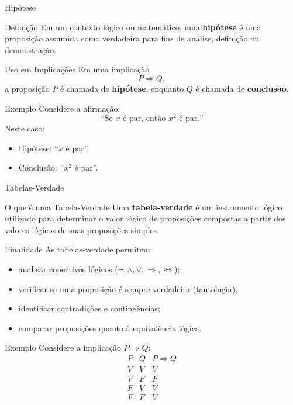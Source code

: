 \documentclass[9pt]{beamer}
\begin{document}
\begin{frame}{Hipótese}

\begin{block}{Definição}
Em um contexto lógico ou matemático, uma \textbf{hipótese} é uma proposição
assumida como verdadeira para fins de análise, definição ou demonstração.
\end{block}

\begin{block}{Uso em Implicações}
Em uma implicação
\[
P \Rightarrow Q,
\]
a proposição $P$ é chamada de \textbf{hipótese},
enquanto $Q$ é chamada de \textbf{conclusão}.
\end{block}

\begin{block}{Exemplo}
Considere a afirmação:
\[
\text{``Se $x$ é par, então $x^2$ é par.''}
\]
Neste caso:
\begin{itemize}
    \item Hipótese: ``$x$ é par''.
    \item Conclusão: ``$x^2$ é par''.
\end{itemize}
\end{block}

\end{frame}
\begin{frame}{Tabelas-Verdade}

\begin{block}{O que é uma Tabela-Verdade}
Uma \textbf{tabela-verdade} é um instrumento lógico utilizado para determinar
o valor lógico de proposições compostas a partir dos valores lógicos
de suas proposições simples.
\end{block}

\begin{block}{Finalidade}
As tabelas-verdade permitem:
\begin{itemize}
    \item analisar conectivos lógicos (\(\neg, \land, \lor, \Rightarrow, \Leftrightarrow\));
    \item verificar se uma proposição é sempre verdadeira (tautologia);
    \item identificar contradições e contingências;
    \item comparar proposições quanto à equivalência lógica.
\end{itemize}
\end{block}

\begin{block}{Exemplo}
Considere a implicação \(P \Rightarrow Q\):
\[
\begin{array}{c|c|c}
P & Q & P \Rightarrow Q \\ \hline
V & V & V \\
V & F & F \\
F & V & V \\
F & F & V
\end{array}
\]
\end{block}

\end{frame}
\end{document}
